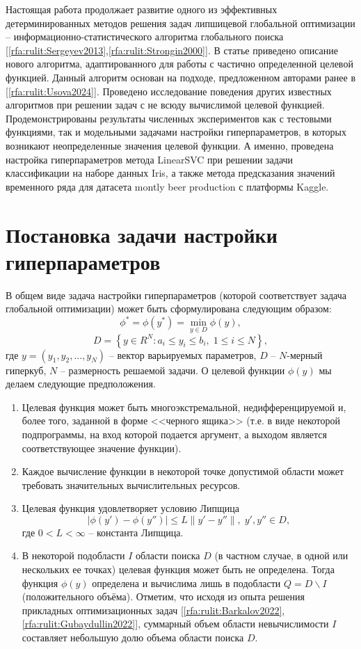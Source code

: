 \documentclass[a4paper,12pt,russian]{article}
\begin{document}
Настоящая работа продолжает развитие одного из эффективных детерминированных методов решения задач липшицевой глобальной оптимизации -- ин\-фор\-ма\-ци\-он\-но-ста\-тис\-ти\-чес\-ко\-го алгоритма глобального поиска [\ref{rfa:rulit:Sergeyev2013},\ref{rfa:rulit:Strongin2000}]. В статье приведено описание нового алгоритма, адаптированного для работы с частично определенной целевой функцией. Данный алгоритм основан на подходе, предложенном авторами ранее в [\ref{rfa:rulit:Usova2024}]. Проведено исследование поведения других известных алгоритмов при решении задач с не всюду вычислимой целевой функцией. Продемонстрированы результаты численных экспериментов как с тестовыми функциями, так и модельными задачами настройки гиперпараметров, в которых возникают неопределенные значения целевой функции. А именно, проведена настройка гиперпараметров метода LinearSVC при решении задачи классификации на наборе данных Iris, а также метода предсказания значений временного ряда для датасета montly beer production с платформы Kaggle.

\section{Постановка задачи настройки гиперпараметров}
В общем виде задача настройки гиперпараметров (которой соответствует задача глобальной оптимизации) может быть сформулирована следующим образом:
\begin{equation}\label{eq1} 
\phi^*=\phi(y^* )=\min_{y \in D}{\phi(y)},
\end{equation}
\[
D=\left\{ y \in R^N: a_i \leq y_i \leq b_i, \; 1 \leq i \leq N\right\},
\]
где $y=(y_1,y_2,...,y_N)$ -- вектор варьируемых параметров, $D$ -- $N$-мерный гиперкуб, $N$ -- размерность решаемой задачи.
О целевой функции $\phi (y)$ мы делаем следующие предположения.

\begin{enumerate}
\item{Целевая функция может быть многоэкстремальной, недифференцируемой и, более того, заданной в форме <<черного ящика>> (т.е. в виде некоторой подпрограммы, на вход которой подается аргумент, а выходом является соответствующее значение функции).}
\item{Каждое вычисление функции в некоторой точке допустимой области может требовать значительных вычислительных ресурсов.}
\item{Целевая функция удовлетворяет условию Липщица
\begin{equation}\label{eq3} 
| \phi (y')-\phi (y'') | \leq L \| y'-y'' \|, \; y',y'' \in D,
\end{equation}
где $0<L<\infty$ -- константа Липщица.}
\item{В некоторой подобласти $I$ области поиска $D$ (в частном случае, в одной или нескольких ее точках) целевая функция может быть не определена. Тогда функция $\phi(y)$ определена и вычислима лишь в подобласти $Q = D \backslash I$ (положительного объёма). Отметим, что исходя из опыта решения прикладных оптимизационных задач [\ref{rfa:rulit:Barkalov2022},\ref{rfa:rulit:Gubaydullin2022}], суммарный объем области невычислимости $I$ составляет небольшую долю объема области поиска $D$.}
\end{enumerate}
\end{document}
